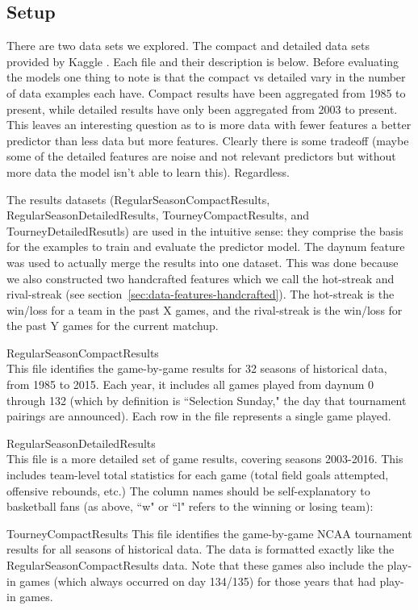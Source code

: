 \documentclass{article} %
\begin{document}
\subsection{Setup}
\label{sec:data-setup}

There are two data sets we explored.  The compact and detailed data sets provided by Kaggle \citep{kagglecompetition}.  Each file and their description is below.  Before evaluating the models one thing to note is that the compact vs detailed vary in the number of data examples each have.  Compact results have been aggregated from 1985 to present, while detailed results have only been aggregated from 2003 to present.  This leaves an interesting question as to is more data with fewer features a better predictor than less data but more features.  Clearly there is some tradeoff (maybe some of the detailed features are noise and not relevant predictors but without more data the model isn't able to learn this).  Regardless.

The results datasets (RegularSeasonCompactResults, RegularSeasonDetailedResults, TourneyCompactResults, and TourneyDetailedResutls) are used in the intuitive sense: they comprise the basis for the examples to train and evaluate the predictor model.  The daynum feature was used to actually merge the results into one dataset.  This was done because we also constructed two handcrafted features which we call the hot-streak and rival-streak (see section~\ref{sec:data-features-handcrafted}).  The hot-streak is the win/loss for a team in the past X games, and the rival-streak is the win/loss for the past Y games for the current matchup.

RegularSeasonCompactResults\\
This file identifies the game-by-game results for 32 seasons of historical data, from 1985 to 2015. Each year, it includes all games played from daynum 0 through 132 (which by definition is ``Selection Sunday," the day that tournament pairings are announced). Each row in the file represents a single game played.


RegularSeasonDetailedResults\\
This file is a more detailed set of game results, covering seasons 2003-2016. This includes team-level total statistics for each game (total field goals attempted, offensive rebounds, etc.) The column names should be self-explanatory to basketball fans (as above, ``w" or ``l" refers to the winning or losing team):


TourneyCompactResults
This file identifies the game-by-game NCAA tournament results for all seasons of historical data. The data is formatted exactly like the RegularSeasonCompactResults data. Note that these games also include the play-in games (which always occurred on day 134/135) for those years that had play-in games.
\end{document}
